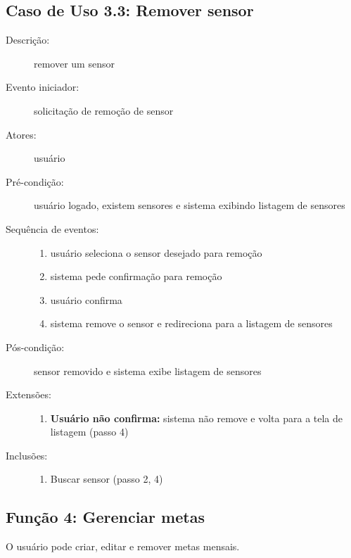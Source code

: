 \subsection{Caso de Uso 3.3: Remover sensor}
\begin{description}
	\item[Descrição:] remover um sensor
	\item[Evento iniciador:] solicitação de remoção de sensor
	\item[Atores:] usuário
	\item[Pré-condição:] usuário logado, existem sensores e sistema exibindo listagem de sensores
	\item[Sequência de eventos:] \hfill
		\begin{enumerate}
			\item{usuário seleciona o sensor desejado para remoção}
			\item{sistema pede confirmação para remoção}
			\item{usuário confirma}
			\item{sistema remove o sensor e redireciona para a listagem de sensores}
		\end{enumerate}
	\item[Pós-condição:] sensor removido e sistema exibe listagem de sensores
	\item[Extensões:] \hfill
		\begin{enumerate}
			\item{\textbf{Usuário não confirma:} sistema não remove e volta para a tela de listagem (passo 4)}
		\end{enumerate}
	\item[Inclusões:] \hfill
		\begin{enumerate}
			\item{Buscar sensor (passo 2, 4)}
		\end{enumerate}
\end{description}
\subsection{Função 4: Gerenciar metas}
O usuário pode criar, editar e remover metas mensais.
%
